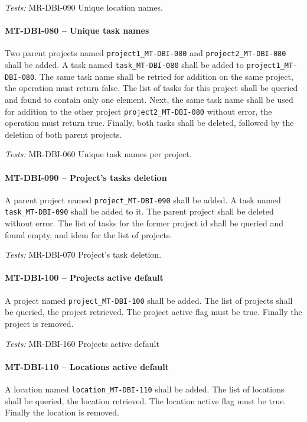 \textit{Tests: } MR-DBI-090 Unique location names.

\paragraph{MT-DBI-080 -- Unique task names}
Two parent projects named \lstinline{project1_MT-DBI-080}
and \lstinline{project2_MT-DBI-080} shall be added.
A task named \lstinline{task_MT-DBI-080} shall be added
to \lstinline{project1_MT-DBI-080}.
The same task name shall be retried for addition on the same
project, the operation must return false.
The list of tasks for this project shall be queried and found
to contain only one element.
Next, the same task name shall be used for addition
to the other project \lstinline{project2_MT-DBI-080}
without error, the operation must return true.
Finally, both tasks shall be deleted, followed by the deletion
of both parent projects.

\textit{Tests: } MR-DBI-060 Unique task names per project.

\paragraph{MT-DBI-090 -- Project's tasks deletion}
A parent project named \lstinline{project_MT-DBI-090}
shall be added.
A task named \lstinline{task_MT-DBI-090} shall be added to it.
The parent project shall be deleted without error.
The list of tasks for the former project id shall be queried
and found empty, and idem for the list of projects.

\textit{Tests: } MR-DBI-070 Project's task deletion.

\paragraph{MT-DBI-100 -- Projects active default}
A project named \lstinline{project_MT-DBI-100} shall be added.
The list of projects shall be queried, the project retrieved.
The project active flag must be true.
Finally the project is removed.

\textit{Tests: } MR-DBI-160 Projects active default

\paragraph{MT-DBI-110 -- Locations active default}
A location named \lstinline{location_MT-DBI-110} shall be added.
The list of locations shall be queried, the location retrieved.
The location active flag must be true.
Finally the location is removed.

